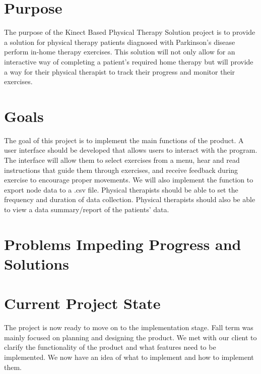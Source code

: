 \documentclass[onecolumn, draftclsnofoot,10pt, compsoc]{IEEEtran}
\begin{document}
\section{Purpose}
The purpose of the Kinect Based Physical Therapy Solution project is to provide a solution for physical therapy patients diagnosed with Parkinson's disease perform in-home therapy exercises. This solution will not only allow for an interactive way of completing a patient's required home therapy but will provide a way for their physical therapist to track their progress and monitor their exercises.

\section{Goals}
The goal of this project is to implement the main functions of the product. A user interface should be developed that allows users to interact with the program. The interface will allow them to select exercises from a menu, hear and read instructions that guide them through exercises, and receive feedback during exercise to encourage proper movements. We will also implement the function to export node data to a .csv file. Physical therapists should be able to set the frequency and duration of data collection. Physical therapists should also be able to view a data summary/report of the patients' data.

\section{Problems Impeding Progress and Solutions}

\section{Current Project State}
The project is now ready to move on to the implementation stage. Fall term was mainly focused on planning and designing the product. We met with our client to clarify the functionality of the product and what features need to be implemented. We now have an idea of what to implement and how to implement them.
\end{document}
